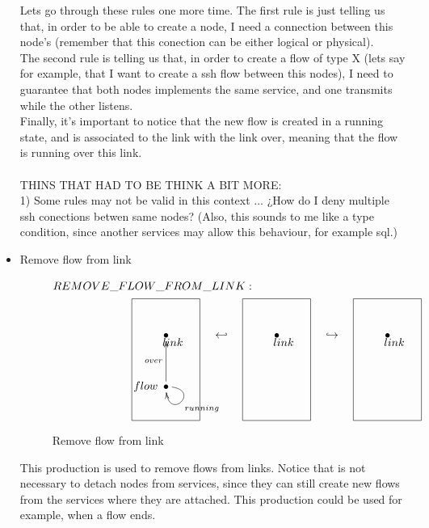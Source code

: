\documentclass[envcountsect,runningheads]{llncs}
\begin{document}
\begin{itemize}
  Lets go through these rules one more time. The first rule is just telling us that, in order to be 
  able to
  create a node, I need a connection between this node's (remember that this conection can be either
  logical or physical).\\
  The second rule is telling us that, in order to create a flow of type X (lets say for example, 
  that I want to create a ssh flow between this nodes), I need to guarantee that 
  both nodes implements the same service, and one transmits while the other 
  listens.\\
  Finally, it's important to notice that the new flow is created in a running state, 
  and is associated to the link with the link over, meaning that the flow is running over 
  this link. \\
  \\
  THINS THAT HAD TO BE THINK A BIT MORE: \\
  1) Some rules may not be valid in this context ... ¿How do I deny multiple ssh 
  conections betwen same nodes? (Also, this sounds to me like a type condition, since another
  services may allow this behaviour, for example sql.) \\
 
 \item Remove flow from link
  \begin{figure}[H]
    \[
       \xymatrix@C=35pt@R=35pt
       {
         {}\POS[]-<1pc,0pc>\drop{REMOVE\_FLOW\_FROM\_LINK:}
         \\
         {\bullet} \POS[]-<-0.5pc,.5pc> \drop{link}
         & {\hookleftarrow} &
         {\bullet} \POS[]-<-0.5pc,.5pc> \drop{link}
         & {\hookrightarrow} &
         {\bullet} \POS[]-<-0.5pc,.5pc> \drop{link}
         \\
         {\bullet} \ar@(r,d)^{running} \ar@{->}^{over}[u] \POS[]-<1.5pc,0pc> \drop{flow} 
         \POS[]+<0pc,2pc> *+=<5pc,9pc>[F-]{} & &
          {}
         \POS[]+<0pc,2pc> *+=<5pc,9pc>[F-]{} & &
         {}
         \POS[]+<0pc,2pc> *+=<5pc,9pc>[F-]{}
       }
    \]
    \caption{Remove flow from link}
    \protect\label{fig:removeflowfromlink}
  \end{figure}
  This production is used to remove flows from links. Notice that is not necessary to detach 
  nodes from services, since they can still create new flows from the services where they 
  are attached. This production could be used for example, when a flow ends.\\
 

\end{itemize}
\end{document}
